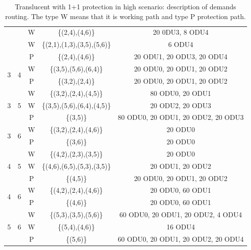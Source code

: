 \begin{table}[h]
\begin{tabular}{||c|c|c|c|c||}
  & &W& \{(2,4),(4,6)\} & 20 0DU3, 8 ODU4 \\
  & &W& \{(2,1),(1,3),(3,5),(5,6)\} & 6 ODU4 \\
  & &P& \{(2,4),(4,6)\} & 20 ODU1, 20 ODU3, 20 ODU4 \\ \hline
 \multirow{2}{*}{3} & \multirow{2}{*}{4}&W& \{(3,5),(5,6),(6,4)\} & 20 ODU0, 20 ODU1, 20 ODU2 \\
  & &P& \{(3,2),(2,4)\} & 20 ODU0, 20 ODU1, 20 ODU2 \\ \hline
 \multirow{3}{*}{3}&\multirow{3}{*}{5}&W&\{(3,2),(2,4),(4,5)\}&80 ODU0, 20 ODU1 \\
  & &W& \{(3,5),(5,6),(6,4),(4,5)\}& 20 ODU2, 20 ODU3\\
  & &P& \{(3,5)\} & 80 ODU0, 20 ODU1, 20 ODU2, 20 ODU3 \\ \hline
 \multirow{2}{*}{3} & \multirow{2}{*}{6}&W& \{(3,2),(2,4),(4,6)\} & 20 ODU0 \\
  & &P& \{(3,6)\} & 20 ODU0 \\ \hline
 \multirow{3}{*}{4} & \multirow{3}{*}{5}&W& \{(4,2),(2,3),(3,5)\} & 20 ODU0 \\
  & &W& \{(4,6),(6,5),(5,3),(3,5)\} & 20 ODU1, 20 ODU2 \\
  & &P& \{(4,5)\} & 20 ODU0, 20 ODU1, 20 ODU2 \\ \hline
 \multirow{2}{*}{4} & \multirow{2}{*}{6}&W& \{(4,2),(2,4),(4,6)\} & 20 ODU0, 60 ODU1\\
  & &P& \{(4,6)\} & 20 ODU0, 60 ODU1\\ \hline
 \multirow{3}{*}{5} & \multirow{3}{*}{6}&W&\{(5,3),(3,5),(5,6)\}& 60 ODU0, 20 ODU1, 20 ODU2, 4 ODU4 \\
  & &W& \{(5,4),(4,6)\} & 16 ODU4 \\
  & &P& \{(5,6)\}& 60 ODU0, 20 ODU1, 20 ODU2, 20 ODU4 \\ \hline
\end{tabular}
\caption{Translucent with 1+1 protection in high scenario: description of demands routing. The type W means that it is working path and type P protection path.}
\label{path_transluc_protec_ref_high}
\end{table}
\newpage
